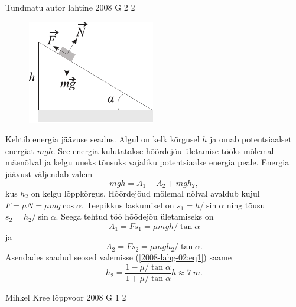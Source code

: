 \documentclass[11pt]{article}
\begin{document}
{%
{Tundmatu autor} %
{lahtine} %
{2008} %
{G 2} %
{2} %
{

\ifSolution
\begin{figure}
	\begin{center}
		\vspace{-25pt}
		\includegraphics[width=0.95\linewidth]{2008-lahg-02-lah}
	\end{center}
\end{figure}
Kehtib energia jäävuse seadus. Algul on kelk kõrgusel $h$ ja omab potentsiaalset energiat $mgh$. See energia kulutatakse hõõrdejõu ületamise tööks mõlemal mäenõlval ja kelgu uueks tõusuks vajaliku potentsiaalse energia peale. Energia jäävust väljendab valem 
\begin{equation} \label{2008-lahg-02:eq1}
mgh= A_1+ A_2+ mgh_2,
\end{equation}
kus $h_2$ on kelgu lõppkõrgus. Hõõrdejõud mõlemal nõlval avaldub kujul $F=\mu N=\mu mg \cos\alpha$. Teepikkus laskumisel on $s_1= h/ \sin\alpha$ ning tõusul $s_2= h_2/ \sin\alpha$. Seega tehtud töö hõõdejõu ületamiseks on
\[
A_1= F s_1=\mu mgh/\tan\alpha
\]
ja
\[
A_2= F s_2=\mu mgh_2/\tan\alpha.
\]
Asendades saadud seosed valemisse (\ref{2008-lahg-02:eq1}) saame
\[
h_2= \frac{1 - \mu/\tan\alpha}{1 + \mu/\tan\alpha}h \approx \SI{7}{m}.
\]
\fi
}

{Mihkel Kree} %
{lõppvoor} %
{2008} %
{G 1} %
{2} %
{

}}
\end{document}
